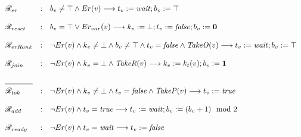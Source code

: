 \documentclass[a4paper, 12pt]{article}
\newcommand{\bz}{\mathbf{0}}
\newcommand{\bo}{\mathbf{1}}
\newcommand{\rk}{k}
\begin{document}
\begin{algorithm*}[!htbp]
\noindent
\[
\begin{array}{lcl}
\mathscr{R}_{er}&:&  b_v\neq\top \wedge Er(v)  \longrightarrow t_v:=\mathit{wait};b_v:=\top\\\\
\mathscr{R}_{reset}&:&   b_v=\top \vee Er_{var}(v) \longrightarrow  \rk_v:=\bot;t_v:=\mathit{false};b_v:=\bz\\\\
\mathscr{R}_{erRank}&:& \neg Er(v) \wedge \rk_v\neq\bot \wedge b_v\neq\top \wedge t_v=\mathit{false} \wedge  \mathit{TakeO}(v) \longrightarrow t_v:=\mathit{wait};b_v:=\top\\\\
\mathscr{R}_{join}&:& \neg Er(v) \wedge \rk_v=\bot \wedge  \mathit{TakeR}(v) \longrightarrow \rk_v:=\rk_t(v);b_v:=\bo \\\\
\hrulefill\\
\mathscr{R}_{tok}&:& \neg Er(v) \wedge \rk_v\neq\bot \wedge t_v=\mathit{false}  \wedge \mathit{TakeP}(v)   \longrightarrow t_v:=\mathit{true} \\\\
\mathscr{R}_{add}&:& \neg Er(v) \wedge t_v=\mathit{true} \longrightarrow t_v:=\mathit{wait};b_v:=(b_v+1)\mod 2  \\\\
\mathscr{R}_{ready}&:& \neg Er(v) \wedge t_v=\mathit{wait} \longrightarrow t_v:=\mathit{false} \\\\
\end{array}
\]
\caption{Algorithm $\mathtt{TokBinV}$ for Node~$v\in V \setminus \{r\}$}
\label{algo:TokBinV}
\end{algorithm*}
\end{document}
